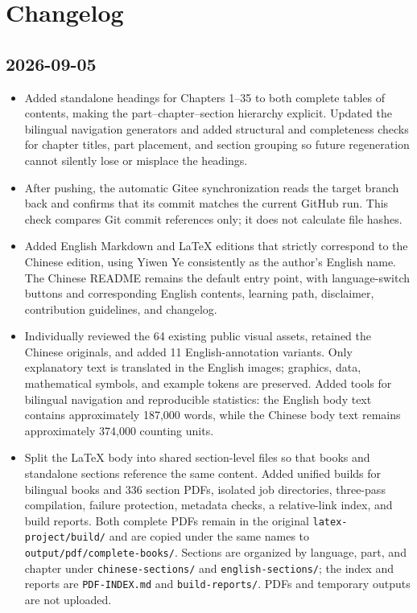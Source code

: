 \hypertarget{changelog}{%
\chapter{Changelog}\label{changelog}}

\hypertarget{section}{%
\section{2026-09-05}\label{section}}

\begin{itemize}
\tightlist
\item
  Added standalone headings for Chapters 1--35 to both complete tables of contents, making the part--chapter--section hierarchy explicit. Updated the bilingual navigation generators and added structural and completeness checks for chapter titles, part placement, and section grouping so future regeneration cannot silently lose or misplace the headings.
\item
  After pushing, the automatic Gitee synchronization reads the target branch back and confirms that its commit matches the current GitHub run. This check compares Git commit references only; it does not calculate file hashes.
\item
  Added English Markdown and LaTeX editions that strictly correspond to the Chinese edition, using Yiwen Ye consistently as the author's English name. The Chinese README remains the default entry point, with language-switch buttons and corresponding English contents, learning path, disclaimer, contribution guidelines, and changelog.
\item
  Individually reviewed the 64 existing public visual assets, retained the Chinese originals, and added 11 English-annotation variants. Only explanatory text is translated in the English images; graphics, data, mathematical symbols, and example tokens are preserved. Added tools for bilingual navigation and reproducible statistics: the English body text contains approximately 187,000 words, while the Chinese body text remains approximately 374,000 counting units.
\item
  Split the LaTeX body into shared section-level files so that books and standalone sections reference the same content. Added unified builds for bilingual books and 336 section PDFs, isolated job directories, three-pass compilation, failure protection, metadata checks, a relative-link index, and build reports. Both complete PDFs remain in the original \texttt{latex-project/build/} and are copied under the same names to \texttt{output/pdf/complete-books/}. Sections are organized by language, part, and chapter under \texttt{chinese-sections/} and \texttt{english-sections/}; the index and reports are \texttt{PDF-INDEX.md} and \texttt{build-reports/}. PDFs and temporary outputs are not uploaded.
\end{itemize}

